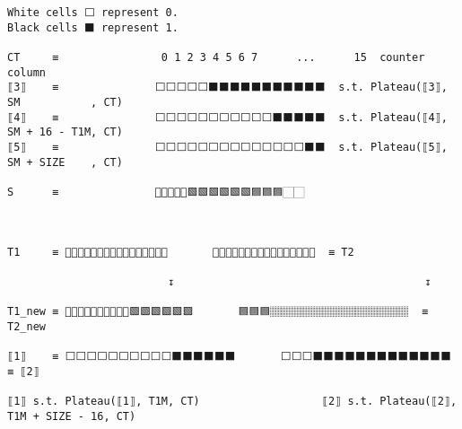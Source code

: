 \documentclass[varwidth=\maxdimen,margin=0.5cm,multi={verbatim}]{standalone}
\begin{document}
\begin{verbatim}
White cells ⬜ represent 0.
Black cells ⬛ represent 1.

CT     ≡                0 1 2 3 4 5 6 7      ...      15  counter column
⟦3⟧    ≡               ⬜⬜⬜⬜⬜⬛⬛⬛⬛⬛⬛⬛⬛⬛⬛⬛  s.t. Plateau(⟦3⟧, SM           , CT)
⟦4⟧    ≡               ⬜⬜⬜⬜⬜⬜⬜⬜⬜⬜⬜⬛⬛⬛⬛⬛  s.t. Plateau(⟦4⟧, SM + 16 - T1M, CT)
⟦5⟧    ≡               ⬜⬜⬜⬜⬜⬜⬜⬜⬜⬜⬜⬜⬜⬜⬛⬛  s.t. Plateau(⟦5⟧, SM + SIZE    , CT)
                       
S      ≡               🏻🏻🏻🏻🏻🟩🟩🟩🟩🟩🟩🟦🟦🟦🏻🏻



T1     ≡ 🏽🏽🏽🏽🏽🏽🏽🏽🏽🏽🏽🏽🏽🏽🏽🏽       🏽🏽🏽🏽🏽🏽🏽🏽🏽🏽🏽🏽🏽🏽🏽🏽  ≡ T2

                         ↧                                       ↧

T1_new ≡ 🏽🏽🏽🏽🏽🏽🏽🏽🏽🏽🟩🟩🟩🟩🟩🟩       🟦🟦🟦🏽🏽🏽🏽🏽🏽🏽🏽🏽🏽🏽🏽🏽  ≡ T2_new

⟦1⟧    ≡ ⬜⬜⬜⬜⬜⬜⬜⬜⬜⬜⬛⬛⬛⬛⬛⬛       ⬜⬜⬜⬛⬛⬛⬛⬛⬛⬛⬛⬛⬛⬛⬛⬛  ≡ ⟦2⟧

⟦1⟧ s.t. Plateau(⟦1⟧, T1M, CT)                   ⟦2⟧ s.t. Plateau(⟦2⟧, T1M + SIZE - 16, CT)
\end{verbatim}
\end{document}
